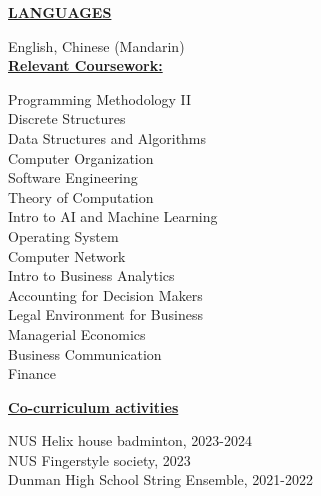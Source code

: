 \documentclass{article}
\begin{document}
\noindent \textbf{\underline{LANGUAGES}} \\
\vspace{-0.2cm}

English, Chinese (Mandarin)\\

\noindent \textbf{\underline{Relevant Coursework:}} \\
\vspace{-0.6cm} %
\begin{multicols}{3}
    \indent\textbullet{} Programming Methodology II \\
    \indent\textbullet{} Discrete Structures \\
    \indent\textbullet{} Data Structures and Algorithms \\
    \indent\textbullet{} Computer Organization \\
    \indent\textbullet{} Software Engineering \\
    \indent\textbullet{} Theory of Computation \\
    \indent\textbullet{} Intro to AI and Machine Learning \\
    \indent\textbullet{} Operating System \\
    \indent\textbullet{} Computer Network \\
    \indent\textbullet{} Intro to Business Analytics \\
    \indent\textbullet{} Accounting for Decision Makers \\
    \indent\textbullet{} Legal Environment for Business \\
    \indent\textbullet{} Managerial Economics \\
    \indent\textbullet{} Business Communication \\
    \indent\textbullet{} Finance \\
\end{multicols}
\noindent \textbf{\underline{Co-curriculum activities}} \\
\vspace{-0.2cm}

\indent\textbullet{} NUS Helix house badminton, 2023-2024 \\
\indent\textbullet{} NUS Fingerstyle society, 2023 \\
\indent\textbullet{} Dunman High School String Ensemble, 2021-2022 \\
\end{document}
